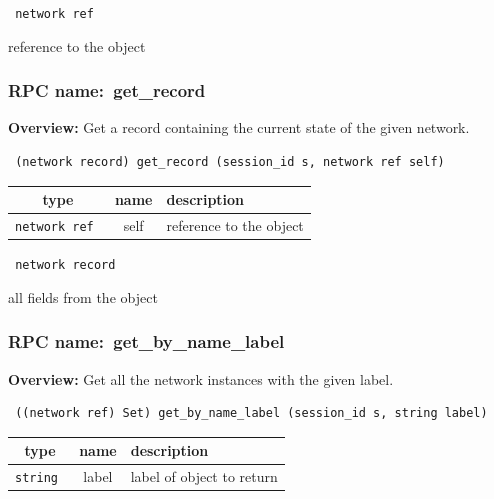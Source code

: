 \vspace{0.3cm}

{\tt 
network ref
}


reference to the object
\vspace{0.3cm}
\vspace{0.3cm}
\vspace{0.3cm}
\subsubsection{RPC name:~get\_record}

{\bf Overview:} 
Get a record containing the current state of the given network.

\begin{verbatim} (network record) get_record (session_id s, network ref self)\end{verbatim}



 
\vspace{0.3cm}
\begin{tabular}{|c|c|p{7cm}|}
 \hline
{\bf type} & {\bf name} & {\bf description} \\ \hline
{\tt network ref } & self & reference to the object \\ \hline 

\end{tabular}

\vspace{0.3cm}

{\tt 
network record
}


all fields from the object
\vspace{0.3cm}
\vspace{0.3cm}
\vspace{0.3cm}
\subsubsection{RPC name:~get\_by\_name\_label}

{\bf Overview:} 
Get all the network instances with the given label.

\begin{verbatim} ((network ref) Set) get_by_name_label (session_id s, string label)\end{verbatim}



 
\vspace{0.3cm}
\begin{tabular}{|c|c|p{7cm}|}
 \hline
{\bf type} & {\bf name} & {\bf description} \\ \hline
{\tt string } & label & label of object to return \\ \hline 

\end{tabular}

